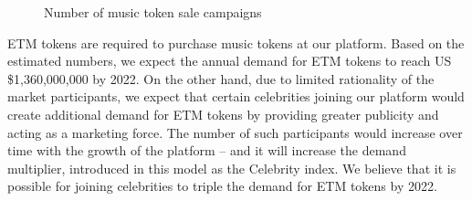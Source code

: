 \documentclass[12pt]{report}
\begin{document}
\begin{figure}[H]
\centering
\caption{Number of music token sale campaigns}
\vspace{20pt}
\salesCount
{}
\end{figure}

ETM tokens are required to purchase music tokens at our platform. Based on the estimated numbers, we expect the annual demand for ETM tokens to reach US \$1,360,000,000 by 2022. On the other hand, due to limited rationality of the market participants, we expect that certain celebrities joining our platform would create additional demand for ETM tokens by providing greater publicity and acting as a marketing force. The number of such participants would increase over time with the growth of the platform – and it will increase the demand multiplier, introduced in this model as the Celebrity index. We believe that it is possible for joining celebrities to triple the demand for ETM tokens by 2022.
\end{document}
